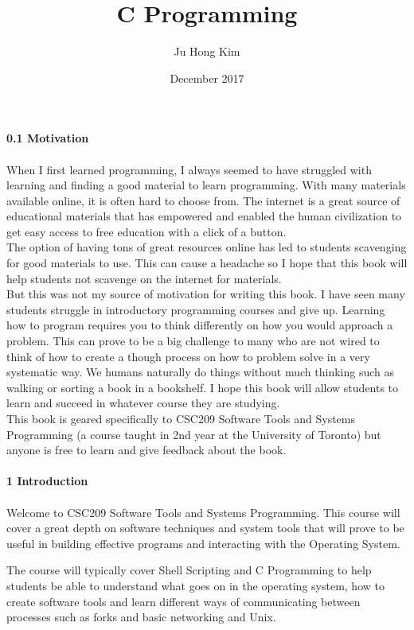 \documentclass{article}
\title{C Programming}
\author{Ju Hong Kim }
\date{December 2017}
\begin{document}
\maketitle

\textbf{0.1 Motivation}
\\~\\

When I first learned programming, I always seemed to have struggled with learning and finding a good material to learn programming. With many materials available online, it is often hard to choose from. The internet is a great source of educational materials that has empowered and enabled the human civilization to get easy access to free education with a click of a button. 
\\

The option of having tons of great resources online has led to students scavenging for good materials to use. This can cause a headache so I hope that this book will help students not scavenge on the internet for materials.
\\

But this was not my source of motivation for writing this book. I have seen many students struggle in introductory programming courses and give up. Learning how to program requires you to think differently on how you would approach a problem. This can prove to be a big challenge to many who are not wired to think of how to create a though process on how to problem solve in a very systematic way. We humans naturally do things without much thinking such as walking or sorting a book in a bookshelf. I hope this book will allow students to learn and succeed in whatever course they are studying.
\\

This book is geared specifically to CSC209 Software Tools and Systems Programming (a course taught in 2nd year at the University of Toronto) but anyone is free to learn and give feedback about the book. 
\\~\\

\textbf{1 Introduction}
\\~\\

Welcome to CSC209 Software Tools and Systems Programming. This course will cover a great depth on software techniques and system tools that will prove to be useful in building effective programs and interacting with the Operating System. 

The course will typically cover Shell Scripting and C Programming to help students be able to understand what goes on in the operating system, how to create software tools and learn different ways of communicating between processes such as forks and basic networking and Unix. 
\\~\\
\end{document}
